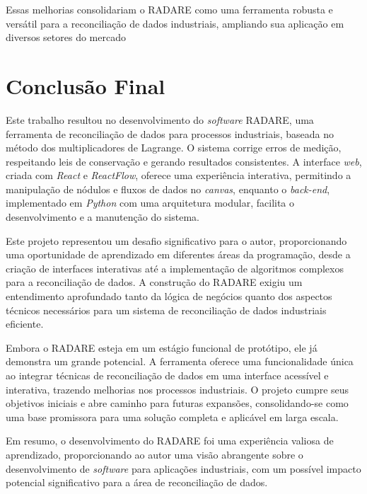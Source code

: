 Essas melhorias consolidariam o RADARE como uma ferramenta robusta e versátil para a reconciliação de dados industriais, ampliando sua aplicação em diversos setores do mercado

\section{Conclusão Final}

Este trabalho resultou no desenvolvimento do \textit{software} RADARE, uma ferramenta de reconciliação de dados para processos industriais, baseada no método dos multiplicadores de Lagrange. O sistema corrige erros de medição, respeitando leis de conservação e gerando resultados consistentes. A interface \textit{web}, criada com \textit{React} e \textit{ReactFlow}, oferece uma experiência interativa, permitindo a manipulação de nódulos e fluxos de dados no \textit{canvas}, enquanto o \textit{back-end}, implementado em \textit{Python} com uma arquitetura modular, facilita o desenvolvimento e a manutenção do sistema.

Este projeto representou um desafio significativo para o autor, proporcionando uma oportunidade de aprendizado em diferentes áreas da programação, desde a criação de interfaces interativas até a implementação de algoritmos complexos para a reconciliação de dados. A construção do RADARE exigiu um entendimento aprofundado tanto da lógica de negócios quanto dos aspectos técnicos necessários para um sistema de reconciliação de dados industriais eficiente.

Embora o RADARE esteja em um estágio funcional de protótipo, ele já demonstra um grande potencial. A ferramenta oferece uma funcionalidade única ao integrar técnicas de reconciliação de dados em uma interface acessível e interativa, trazendo melhorias nos processos industriais. O projeto cumpre seus objetivos iniciais e abre caminho para futuras expansões, consolidando-se como uma base promissora para uma solução completa e aplicável em larga escala.

Em resumo, o desenvolvimento do RADARE foi uma experiência valiosa de aprendizado, proporcionando ao autor uma visão abrangente sobre o desenvolvimento de \textit{software} para aplicações industriais, com um possível impacto potencial significativo para a área de reconciliação de dados.
